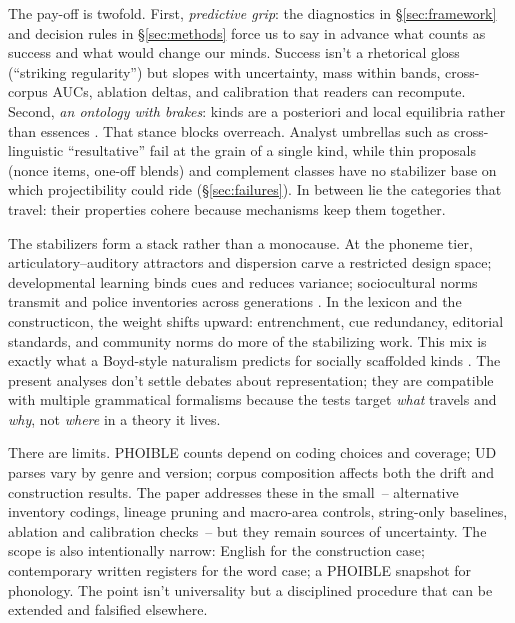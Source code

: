 \documentclass[12pt]{article}
\begin{document}
The pay-off is twofold. First, \emph{predictive grip}: the diagnostics in \S\ref{sec:framework} and decision rules in \S\ref{sec:methods} force us to say in advance what counts as success and what would change our minds. Success isn't a rhetorical gloss (“striking regularity”) but slopes with uncertainty, mass within bands, cross-corpus AUCs, ablation deltas, and calibration that readers can recompute. Second, \emph{an ontology with brakes}: kinds are a posteriori and local equilibria rather than essences \citep{Boyd1991Enthusiasm,Boyd1999Homeostasis}. That stance blocks overreach. Analyst umbrellas such as cross-linguistic “resultative” fail at the grain of a single kind, while thin proposals (nonce items, one-off blends) and complement classes have no stabilizer base on which projectibility could ride (\S\ref{sec:failures}). In between lie the categories that travel: their properties cohere because mechanisms keep them together.

The stabilizers form a stack rather than a monocause. At the phoneme tier, articulatory–auditory attractors and dispersion carve a restricted design space; developmental learning binds cues and reduces variance; sociocultural norms transmit and police inventories across generations \citep{Stevens1989Quantal,LiljencrantsLindblom1972,Lindblom1990HandH,Ekstrom2025PhonemeTool}. In the lexicon and the constructicon, the weight shifts upward: entrenchment, cue redundancy, editorial standards, and community norms do more of the stabilizing work. This mix is exactly what a Boyd-style naturalism predicts for socially scaffolded kinds \citep{Boyd2000Workmanship,Khalidi2013}. The present analyses don't settle debates about representation; they are compatible with multiple grammatical formalisms because the tests target \emph{what} travels and \emph{why}, not \emph{where} in a theory it lives.

There are limits. PHOIBLE counts depend on coding choices and coverage; UD parses vary by genre and version; corpus composition affects both the drift and construction results. The paper addresses these in the small~-- alternative inventory codings, lineage pruning and macro-area controls, string-only baselines, ablation and calibration checks~-- but they remain sources of uncertainty. The scope is also intentionally narrow: English for the construction case; contemporary written registers for the word case; a PHOIBLE snapshot for phonology. The point isn't universality but a disciplined procedure that can be extended and falsified elsewhere.
\end{document}
